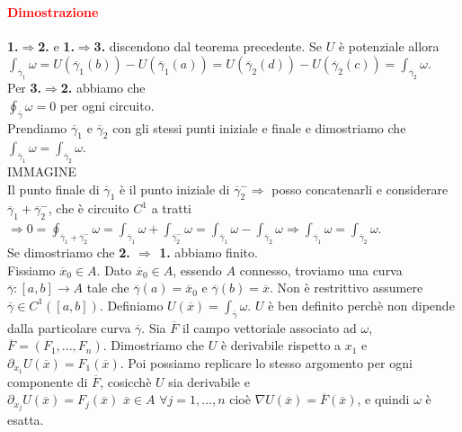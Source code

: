 \documentclass{article}
\begin{document}
\paragraph{\textcolor{red}{Dimostrazione}}
\textbf{1.$\Rightarrow $2.} e \textbf{1.$\Rightarrow $3.} discendono dal teorema precedente. Se $U$ è potenziale allora\\
$\int_{\overline{\gamma}_1}\omega=U(\overline{\gamma}_1(b))-U(\overline{\gamma}_1(a))=U(\overline{\gamma}_2(d))-U(\overline{\gamma}_2(c))=\int_{\overline{\gamma}_2}\omega$.\\
Per \textbf{3.$\Rightarrow$2.} abbiamo che\\
$\oint_{\overline{\gamma}}\omega =0$ per ogni circuito.\\
Prendiamo $\overline{\gamma}_1$ e $\overline{\gamma}_2$ con gli stessi punti iniziale e finale e dimostriamo che $\int_{\overline{\gamma}_1}\omega=\int_{\overline{\gamma}_2}\omega$.\\
IMMAGINE\\
Il punto finale di $\overline{\gamma}_1$ è il punto iniziale di $\overline{\gamma}_2^- \Rightarrow$ posso concatenarli e considerare $\overline{\gamma}_1+\overline{\gamma}_2^-$, che è circuito $C^1$ a tratti\\
$\Rightarrow 0 =\oint_{\overline{\gamma}_1+\overline{\gamma}_2^-}\omega=\int_{\overline{\gamma}_1}\omega+\int_{\overline{\gamma}_2^-}\omega= \int_{\overline{\gamma}_1}\omega - \int_{\overline{\gamma}_2}\omega\Rightarrow \int_{\overline{\gamma}_1}\omega = \int_{\overline{\gamma}_2}\omega$.\\
Se dimostriamo che \textbf{2. $\Rightarrow$ 1.} abbiamo finito.\\
Fissiamo $\overline{x}_0\in A$. Dato $\overline{x}_0 \in A$,  essendo $A$ connesso, troviamo una curva $\overline{\gamma}:[a,b]\rightarrow A$ tale che $\overline{\gamma}(a)=\overline{x}_0$ e $\overline{\gamma}(b)=\overline{x}$. Non è restrittivo assumere $\overline{\gamma}\in C^1([a,b])$. Definiamo $U(\overline{x})=\int_{\overline{\gamma}}\omega$. $U $ è ben definito perchè non dipende dalla particolare curva $\overline{\gamma}$. Sia $\overline{F}$ il campo vettoriale associato ad $\omega$, $\overline{F}=(F_1,...,F_n)$. Dimostriamo che $U$ è derivabile rispetto a $x_1$ e $\partial_{x_1}U(\overline{x})=F_1(\overline{x})$. Poi possiamo replicare lo stesso argomento per ogni componente di $\overline{F}$, cosicchè $U$ sia derivabile e $\partial_{x_j}U(\overline{x})=F_j(\overline{x})\,\, \overline{x}\in A\,\, \forall j=1,...,n$ cioè $\nabla U(\overline{x})=\overline{F}(\overline{x})$, e quindi $\omega$ è esatta.\\
\end{document}
